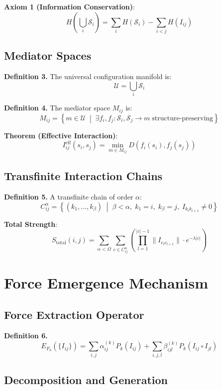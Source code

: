 \documentclass[11pt]{article}
\begin{document}
\textbf{Axiom 1 (Information Conservation)}:
\[
H\left(\bigcup_i \mathcal{S}_i\right) = \sum_i H(\mathcal{S}_i) - \sum_{i<j} H(I_{ij})
\]

\subsection{Mediator Spaces}

\textbf{Definition 3.} The universal configuration manifold is:
\[
\mathcal{U} = \bigcup_i \mathcal{S}_i
\]

\textbf{Definition 4.} The mediator space $M_{ij}$ is:
\[
M_{ij} = \left\{ m \in \mathcal{U} \;\middle|\; \exists f_i, f_j : \mathcal{S}_i, \mathcal{S}_j \rightarrow m \;\text{structure-preserving} \right\}
\]

\textbf{Theorem (Effective Interaction)}:
\[
I^{\mathrm{eff}}_{ij}(s_i, s_j) = \min_{m \in M_{ij}} D(f_i(s_i), f_j(s_j))
\]

\subsection{Transfinite Interaction Chains}

\textbf{Definition 5.} A transfinite chain of order $\alpha$:
\[
C^\alpha_{ij} = \left\{ (k_1, ..., k_\beta) \;\middle|\; \beta < \alpha,\; k_1 = i,\; k_\beta = j,\; I_{k_l k_{l+1}} \neq 0 \right\}
\]

\textbf{Total Strength}:
\[
S_{\text{total}}(i,j) = \sum_{\alpha < \Omega} \sum_{c \in C^\alpha_{ij}} \left( \prod_{l=1}^{|c|-1} \|I_{c_l c_{l+1}}\| \cdot e^{-\lambda |c|} \right)
\]

\section{Force Emergence Mechanism}

\subsection{Force Extraction Operator}

\textbf{Definition 6.}
\[
E_{F_k} \left( \{I_{ij}\} \right) = \sum_{i,j} \alpha^{(k)}_{ij} P_k(I_{ij}) + \sum_{i,j,l} \beta^{(k)}_{ijl} P_k(I_{ij} \circ I_{jl})
\]

\subsection{Decomposition and Generation}
\end{document}
